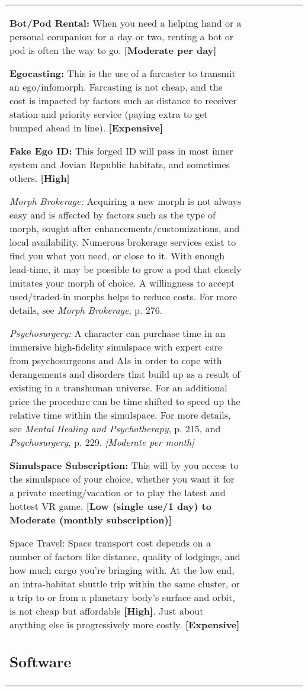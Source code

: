 \begin{tabular}{|l|l|l|l|l|l|l|}
\textbf{Bot/Pod Rental:} When you need a helping hand or a personal companion for a day or two, renting a bot or pod is often the way to go. \textbf{[Moderate per day]} 

\textbf{Egocasting:} This is the use of a farcaster to transmit an ego/infomorph. Farcasting is not cheap, and the cost is impacted by factors such as distance to receiver station and priority service (paying extra to get bumped ahead in line). \textbf{[Expensive]} 

\textbf{Fake Ego ID:} This forged ID will pass in most inner system and Jovian Republic habitats, and sometimes others. \textbf{[High]} 

\emph{Morph Brokerage:} Acquiring a new morph is not always easy and is affected by factors such as the type of morph, sought-after enhancements/customizations, and local availability. Numerous brokerage services exist to find you what you need, or close to it. With enough lead-time, it may be possible to grow a pod that closely imitates your morph of choice. A willingness to accept used/traded-in morphs helps to reduce costs. For more details, see \emph{Morph Brokerage}, p. 276. 

\emph{Psychosurgery:} A character can purchase time in an immersive high-fidelity simulspace with expert care from psychosurgeons and AIs in order to cope with derangements and disorders that build up as a result of existing in a transhuman universe. For an additional price the procedure can be time shifted to speed up the relative time within the simulspace. For more details, see \emph{Mental Healing and Psychotherapy}, p. 215, and \emph{Psychosurgery}, p. 229. \emph{[Moderate per month]} 

\textbf{Simulspace Subscription:} This will by you access to the simulspace of your choice, whether you want it for a private meeting/vacation or to play the latest and hottest VR game. \textbf{[Low (single use/1 day) to Moderate (monthly subscription)]} 

Space Travel: Space transport cost depends on a number of factors like distance, quality of lodgings, and how much cargo you’re bringing with. At the low end, an intra-habitat shuttle trip within the same cluster, or a trip to or from a planetary body’s surface and orbit, is not cheap but affordable \textbf{[High]}. Just about anything else is progressively more costly. \textbf{[Expensive]} 

\subsection{Software} \label{sec:software} 


\end{tabular}
